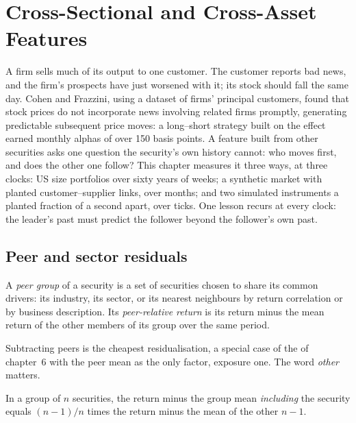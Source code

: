 \chapter{Cross-Sectional and Cross-Asset Features}\label{ch:rs:cross-sectional-and-cross-asset-features}

A firm sells much of its output to one customer. The customer reports bad news, and the firm's prospects have just
worsened with it; its stock should fall the same day. Cohen and Frazzini, using a dataset of firms' principal customers, found
that stock prices do not incorporate news involving related firms promptly, generating predictable subsequent price moves: a
long--short strategy built on the effect earned monthly alphas of over 150 basis points. A feature built from other securities
asks one question the security's own history cannot: who moves first, and does the other one follow? This chapter measures it
three ways, at three clocks: US size portfolios over sixty years of weeks; a synthetic market with planted customer--supplier
links, over months; and two simulated instruments a planted fraction of a second apart, over ticks. One lesson recurs at every
clock: the leader's past must predict the follower beyond the follower's own past.

\section{Peer and sector residuals}

\begin{definition}\label{def:rs:cross-sectional-and-cross-asset-features:peer}
A \emph{peer group} of a security is a set of securities chosen to share its common drivers: its industry,
its sector, or its nearest neighbours by return correlation or by business description. Its \emph{peer-relative
return} is its return minus the mean return of the other members of its group over the same
period.
\end{definition}

Subtracting peers is the cheapest residualisation, a special case of the  of chapter~6 with the peer mean as
the only factor, exposure one. The word \emph{other} matters.

\begin{proposition}\label{prop:rs:cross-sectional-and-cross-asset-features:loo}
In a group of $n$ securities, the return minus the group mean \emph{including} the security equals $(n-1)/n$ times the return
minus the mean of the other $n-1$.
\end{proposition}

